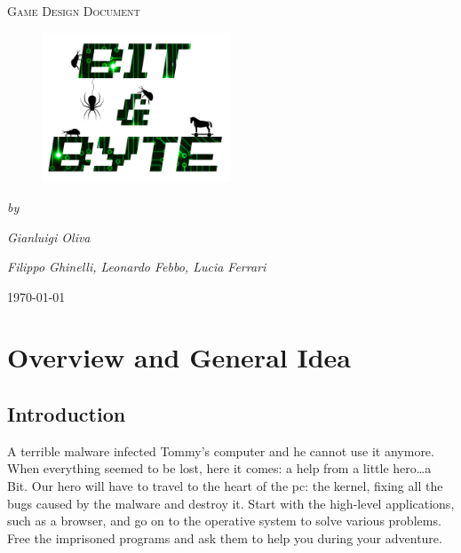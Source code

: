 \documentclass[12pt, a4paper]{report}
\begin{document}
\begin{titlepage}
	\centering
	\vspace{1cm}
	\vspace{1cm}

	{\scshape\Large Game Design Document\par}
	\vspace{0.1cm}
	\begin{figure}[H]
		\centering
		\includegraphics[width=0.5\textwidth]{images/Logo}
	\end{figure}
	\vspace{1cm}
	\vspace{3cm}
	{\Large\itshape by\par}
	{\Large\itshape Gianluigi Oliva\par}
	{\Large\itshape Filippo Ghinelli, Leonardo Febbo, Lucia Ferrari\par}
	\vspace{1.5cm}
	\vfill
	


	\vfill

	{\large \today\par}
\end{titlepage}

\newpage
\tableofcontents
\newpage

\chapter{Overview and General Idea}
\section*{Introduction}
A terrible malware infected Tommy’s computer and he cannot use it anymore. When everything seemed to be lost, here it comes: a help from a little hero…a Bit. Our hero will have to travel to the heart of the pc: the kernel, fixing all the bugs caused by the malware and destroy it. Start with the high-level applications, such as a browser, and go on to the operative system to solve various problems. Free the imprisoned programs and ask them to help you during your adventure.\\
\end{document}
